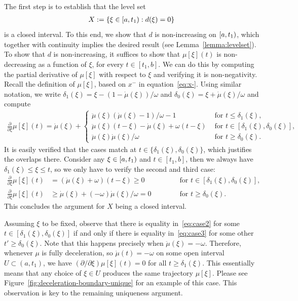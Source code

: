\documentclass[a4paper]{article}
\theoremstyle{definition}
\theoremstyle{plain}
\begin{document}
The first step is to establish that the level set
\begin{align}
  X := \{ \xi \in [a,t_{1}) : d(\xi) = 0 \}
\end{align}
is a closed interval. To this end, we show that $d$ is non-increasing on
$[a,t_{1})$, which together with continuity implies the desired result
(see Lemma~\ref{lemma:levelset}).
%
To show that $d$ is non-increasing, it suffices to show that $\mu[\xi](t)$ is
non-decreasing as a function of $\xi$, for every $t \in [t_{1}, b]$.
%
We can do this by computing the partial derivative of $\mu[\xi]$ with respect to $\xi$
and verifying it is non-negativity.
%
Recall the definition of $\mu[\xi]$, based on $x^{-}$ in equation~\eqref{eq:x-}.
%
Using similar notation, we write
$\delta_{1}(\xi) = \xi - (1 - \dot{\mu}(\xi))/\omega$ and
$\delta_{0}(\xi) = \xi + \dot{\mu}(\xi)/\omega$ and compute
%
\begin{align}
  \frac{\partial}{\partial \xi} \mu[\xi](t) =
  \dot{\mu}(\xi) +
  \begin{cases}
    \ddot{\mu}(\xi)(\dot{\mu}(\xi)-1)/\omega - 1 &\text{ for } t \leq \delta_{1}(\xi) , \\
    \ddot{\mu}(\xi)(t-\xi) - \dot{\mu}(\xi) + \omega(t-\xi) &\text{ for } t \in [\delta_{1}(\xi),\delta_{0}(\xi)] , \\
    \ddot{\mu}(\xi)\dot{\mu}(\xi)/ \omega &\text{ for } t \geq \delta_{0}(\xi) .
  \end{cases}
\end{align}
%
It is easily verified that the cases match at
$t \in \{\delta_{1}(\xi), \delta_{0}(\xi)\}$, which justifies the overlaps there.
%
Consider any $\xi \in [a,t_{1})$ and $t \in [t_{1}, b]$, then we always have
$\delta_{1}(\xi) \leq \xi \leq t$, so we only have to verify the second and third case:
%
\begin{subequations}
\begin{alignat}{2}
  \frac{\partial}{\partial \xi} \mu[\xi](t) &= (\ddot{\mu}(\xi) + \omega)(t-\xi) \geq 0 \quad\quad\quad &&\text{ for } t \in [\delta_{1}(\xi) ,\delta_{0}(\xi)], \label{eq:case2} \\
  \frac{\partial}{\partial \xi} \mu[\xi](t) &\geq \dot{\mu}(\xi) + (-\omega)\dot{\mu}(\xi)/\omega = 0 &&\text{ for } t \geq \delta_{0}(\xi) . \label{eq:case3}
\end{alignat}
\end{subequations}
%
This concludes the argument for $X$ being a closed interval.

Assuming $\xi$ to be fixed, observe that there is equality in~\eqref{eq:case2} for some
$t \in [\delta_{1}(\xi), \delta_{0}(\xi)]$ if and only if there is equality in~\eqref{eq:case3}
for some other $t' \geq \delta_{0}(\xi)$. Note that this happens precisely when
$\ddot{\mu}(\xi) = -\omega$.
%
Therefore, whenever $\mu$ is fully deceleration, so $\dot{\mu}(t)=-\omega$ on
some open interval $U \subset (a, t_{1})$, we have
$(\partial/\partial \xi) \mu[\xi](t) = 0$ for all $t \geq \delta_{1}(\xi)$.
%
This essentially means that any choice of $\xi \in U$ produces the same
trajectory $\mu[\xi]$. Please see Figure~\ref{fig:deceleration-boundary-unique}
for an example of this case.
%
This observation is key to the remaining uniqueness argument.
\end{document}
